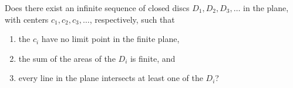 Does there exist an infinite sequence of closed discs $D_1, D_2, D_3,
\dots$ in the plane, with centers $c_1, c_2, c_3, \dots$, respectively,
such that
\begin{enumerate}
    \item the $c_i$ have no limit point in the finite plane,
    \item the sum of the areas of the $D_i$ is finite, and
    \item every line in the plane intersects at least one of the $D_i$?
\end{enumerate}
